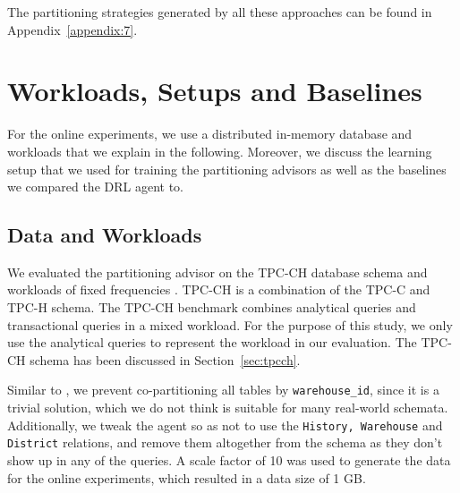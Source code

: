 The partitioning strategies generated by all these approaches can be found in Appendix~\ref{appendix:7}.

\section{Workloads, Setups and Baselines}
For the online experiments, we use a distributed in-memory database and workloads that we explain in the following. Moreover, we discuss the learning setup that we used for training the partitioning advisors as well as the baselines we compared the DRL agent to.

\subsection{Data and Workloads}
We evaluated the partitioning advisor on the TPC-CH database schema and workloads of fixed frequencies \cite{Cole:2011:MWC:1988842.1988850}. TPC-CH is a combination of the TPC-C and TPC-H schema. The TPC-CH benchmark combines analytical queries and transactional queries in a mixed workload. For the purpose of this study, we only use the analytical queries to represent the workload in our evaluation. The TPC-CH schema has been discussed in Section~\ref{sec:tpcch}.

Similar to \cite{Hilprecht:2019:TLP:3329859.3329876, DBLP:conf/sigmod/HilprechtBR20}, we prevent co-partitioning all tables by \texttt{warehouse\_id}, since it is a trivial solution, which we do not think is suitable for many real-world schemata. Additionally, we tweak the agent so as not to use the \texttt{History, Warehouse} and \texttt{District} relations, and remove them altogether from the schema as they don't show up in any of the queries. A scale factor of 10 was used to generate the data for the online experiments, which resulted in a data size of 1 GB.


